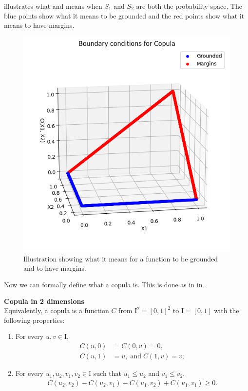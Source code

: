  illustrates what  and  means when $S_1$ and $S_2$ are both the probability space. The blue points show what it means to be grounded and the red points show what it means to have margins. 

\begin{figure}
    \centering
    \includegraphics[width=0.5\linewidth]{3Theory/pictures/MarginsAndGrounded.png}
    \caption{Illustration showing what it means for a function to be grounded and to have margins.}
    \label{fig:GroundedAndMargins}
\end{figure}

Now we can formally define what a copula is. This is done as in \citet[p.~10]{Nelsen2006} in .
\begin{definition}\label{def:copula}
            \textbf{Copula in 2 dimensions}\\
            Equivalently, a copula is a function $C$ from $\mathrm{I}^2=[0,1]^2$ to $\mathrm{I} = [0,1]$ with the following properties:
            \begin{enumerate}
                \item For every $u, v \in \mathrm{I}$,
                \begin{align*}
                    C(u,0) &= C(0,v) = 0,\\
                    C(u,1) &= u, \; \mathrm{and } \; C(1,v) = v;
                \end{align*}
                \item For every $u_1, u_2, v_1, v_2 \in \mathrm{I}$ such that $u_1 \leq u_2$ and $v_1 \leq v_2$,
                \begin{align*}
                    C(u_2,v_2) - C(u_2,v_1) - C(u_1,v_2) + C(u_1,v_1) \geq 0.
                \end{align*}
            \end{enumerate}
\end{definition}


